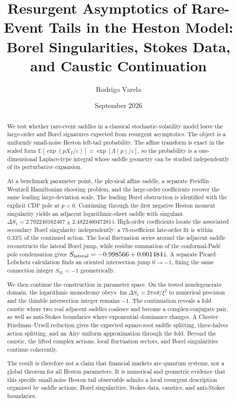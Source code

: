 \documentclass[11pt]{article}
\title{Resurgent Asymptotics of Rare-Event Tails in the Heston Model:\\Borel Singularities, Stokes Data, and Caustic Continuation}
\author{Rodrigo Varela}
\date{September 2026}
\newcommand{\E}{\mathbb E}
\newcommand{\ii}{\mathrm i}
\begin{document}
\maketitle

\begin{abstract}
We test whether rare-event saddles in a classical stochastic-volatility model leave the large-order and Borel signatures expected from resurgent asymptotics.  The object is a uniformly small-noise Heston left-tail probability.  The affine transform is exact in the scaled form $\E[\exp(pX_T/\varepsilon)]=\exp[\Lambda(p)/\varepsilon]$, so the probability is a one-dimensional Laplace-type integral whose saddle geometry can be studied independently of its perturbative expansion.

At a benchmark parameter point, the physical affine saddle, a separate Freidlin--Wentzell Hamiltonian shooting problem, and the large-order coefficients recover the same leading large-deviation scale.  The leading Borel obstruction is identified with the explicit CDF pole at $p=0$.  Continuing through the first negative Heston moment singularity yields an adjacent logarithmic-sheet saddle with singulant $\Delta S_1=2.792240162467\pm2.482246047281\,\ii$.  High-order coefficients locate the associated secondary Borel singularity independently: a 75-coefficient late-order fit is within $0.33\%$ of the continued action.  The local fluctuation series around the adjacent saddle reconstructs the lateral Borel jump, while residue summation of the conformal-Pad\'e pole condensation gives $S_{\rm lateral}=-0.998566+0.001484\,\ii$.  A separate Picard--Lefschetz calculation finds an oriented intersection jump $0\to-1$, fixing the same connection integer $S_{01}=-1$ geometrically.

We then continue the construction in parameter space.  On the tested nondegenerate domain, the logarithmic monodromy obeys $\operatorname{Im}\Delta S_1=2\pi\kappa\theta/\xi^2$ to numerical precision and the thimble intersection integer remains $-1$.  The continuation reveals a fold caustic where two real adjacent saddles coalesce and become a complex-conjugate pair, as well as anti-Stokes boundaries where exponential dominance changes.  A Chester--Friedman--Ursell reduction gives the expected square-root saddle splitting, three-halves action splitting, and an Airy uniform approximation through the fold.  Beyond the caustic, the lifted complex actions, local fluctuation sectors, and Borel singularities continue coherently.

The result is therefore not a claim that financial markets are quantum systems, nor a global theorem for all Heston parameters.  It is numerical and geometric evidence that this specific small-noise Heston tail observable admits a local resurgent description organised by saddle actions, Borel singularities, Stokes data, caustics, and anti-Stokes boundaries.
\end{abstract}
\end{document}
